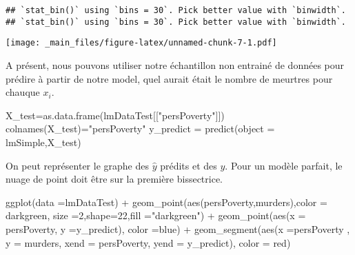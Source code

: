 \documentclass[
]{book}
\newenvironment{Shaded}{\begin{snugshade}}{\end{snugshade}}
\newcommand{\AttributeTok}[1]{\textcolor[rgb]{0.77,0.63,0.00}{#1}}
\newcommand{\DecValTok}[1]{\textcolor[rgb]{0.00,0.00,0.81}{#1}}
\newcommand{\FunctionTok}[1]{\textcolor[rgb]{0.00,0.00,0.00}{#1}}
\newcommand{\NormalTok}[1]{#1}
\newcommand{\OtherTok}[1]{\textcolor[rgb]{0.56,0.35,0.01}{#1}}
\newcommand{\SpecialCharTok}[1]{\textcolor[rgb]{0.00,0.00,0.00}{#1}}
\newcommand{\StringTok}[1]{\textcolor[rgb]{0.31,0.60,0.02}{#1}}
\begin{document}
\begin{verbatim}
## `stat_bin()` using `bins = 30`. Pick better value with `binwidth`.
## `stat_bin()` using `bins = 30`. Pick better value with `binwidth`.
\end{verbatim}

\texttt{[image: \_main\_files/figure-latex/unnamed-chunk-7-1.pdf]}

A présent, nous pouvons utiliser notre échantillon non entrainé de données pour prédire à partir de notre model, quel aurait était le nombre de meurtres pour chauque \(x_i\).\\

\begin{Shaded}
\begin{Highlighting}[]
\NormalTok{X\_test}\OtherTok{=}\FunctionTok{as.data.frame}\NormalTok{(lmDataTest[[}\StringTok{"persPoverty"}\NormalTok{]])}
\FunctionTok{colnames}\NormalTok{(X\_test)}\OtherTok{=}\StringTok{"persPoverty"}
\NormalTok{y\_predict }\OtherTok{=} \FunctionTok{predict}\NormalTok{(}\AttributeTok{object =}\NormalTok{ lmSimple,X\_test)}
\end{Highlighting}
\end{Shaded}

On peut représenter le graphe des \(\hat y\) prédits et des \(y\). Pour un modèle parfait, le nuage de point doit être sur la première bissectrice.\\

\begin{Shaded}
\begin{Highlighting}[]
\FunctionTok{ggplot}\NormalTok{(}\AttributeTok{data =}\NormalTok{lmDataTest) }\SpecialCharTok{+}
  \FunctionTok{geom\_point}\NormalTok{(}\FunctionTok{aes}\NormalTok{(persPoverty,murders),}\AttributeTok{color =} \StringTok{\textquotesingle{}darkgreen\textquotesingle{}}\NormalTok{,}
             \AttributeTok{size =}\DecValTok{2}\NormalTok{,}\AttributeTok{shape=}\DecValTok{22}\NormalTok{,}\AttributeTok{fill =}\StringTok{"darkgreen"}\NormalTok{) }\SpecialCharTok{+}
  \FunctionTok{geom\_point}\NormalTok{(}\FunctionTok{aes}\NormalTok{(}\AttributeTok{x =}\NormalTok{ persPoverty, }\AttributeTok{y =}\NormalTok{y\_predict), }\AttributeTok{color =}\StringTok{\textquotesingle{}blue\textquotesingle{}}\NormalTok{) }\SpecialCharTok{+}
  \FunctionTok{geom\_segment}\NormalTok{(}\FunctionTok{aes}\NormalTok{(}\AttributeTok{x =}\NormalTok{persPoverty , }
                   \AttributeTok{y =}\NormalTok{ murders, }\AttributeTok{xend =}\NormalTok{ persPoverty, }\AttributeTok{yend =}\NormalTok{ y\_predict),}
               \AttributeTok{color =} \StringTok{\textquotesingle{}red\textquotesingle{}}\NormalTok{)}
\end{Highlighting}
\end{Shaded}
\end{document}
